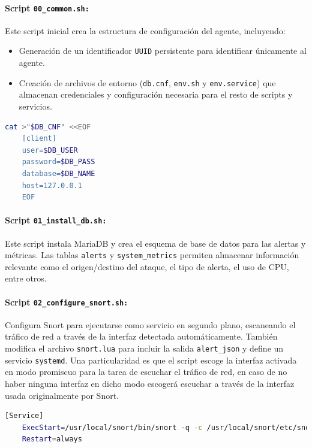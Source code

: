 \documentclass[11pt,a4paper,twoside]{report}
\begin{document}
\paragraph{Script \texttt{00\_common.sh:}} Este script inicial crea la estructura de configuración del agente, incluyendo:

\begin{itemize}
	\item Generación de un identificador \texttt{UUID} persistente para identificar únicamente al agente.
	\item Creación de archivos de entorno (\texttt{db.cnf}, \texttt{env.sh} y \texttt{env.service}) que almacenan credenciales y configuración necesaria para el resto de scripts y servicios.
\end{itemize}

\begin{lstlisting}[language=bash, caption={Fragmento de creación del archivo db.cnf}]
	cat >"$DB_CNF" <<EOF
	[client]
	user=$DB_USER
	password=$DB_PASS
	database=$DB_NAME
	host=127.0.0.1
	EOF
\end{lstlisting}

\newpage

\paragraph{Script \texttt{01\_install\_db.sh:}} Este script instala MariaDB y crea el esquema de base de datos para las alertas y métricas. Las tablas \texttt{alerts} y \texttt{system\_metrics} permiten almacenar información relevante como el origen/destino del ataque, el tipo de alerta, el uso de CPU, entre otros.

\paragraph{Script \texttt{02\_configure\_snort.sh:}} Configura Snort para ejecutarse como servicio en segundo plano, escaneando el tráfico de red a través de la interfaz detectada automáticamente. También modifica el archivo \texttt{snort.lua} para incluir la salida \texttt{alert\_json} y define un servicio \texttt{systemd}. Una particularidad es que el script escoge la interfaz activada en modo promiscuo para la tarea de escuchar el tráfico de red, en caso de no haber ninguna interfaz en dicho modo escogerá escuchar a través de la interfaz usada originalmente por Snort.

\begin{lstlisting}[language=bash, caption={Definición del servicio systemd para Snort}]
	[Service]
	ExecStart=/usr/local/snort/bin/snort -q -c /usr/local/snort/etc/snort/snort.lua -i $IFACE -A alert_json -l /opt/snort/logs/live
	Restart=always
\end{lstlisting}
\end{document}
